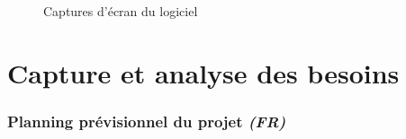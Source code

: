 \documentclass[paper=a4, fontsize=11pt]{report}
\numberwithin{equation}{section}		%
\numberwithin{figure}{section}		%
\numberwithin{table}{section}		%
\renewcommand{\it}[1]{\textit{#1}}
\begin{document}
\begin{figure}[hbtp]
\centering
\noindent{}

\noindent{}
\caption{Captures d'écran du logiciel}

\end{figure}





\part{Capture et analyse des besoins}
\label{part:capture-et-analyse-des-besoins}
\setcounter{section}{0}

\section{Planning prévisionnel du projet \it{(FR)}}
\label{sec:planning-previsionnel-du-projet}
\end{document}
